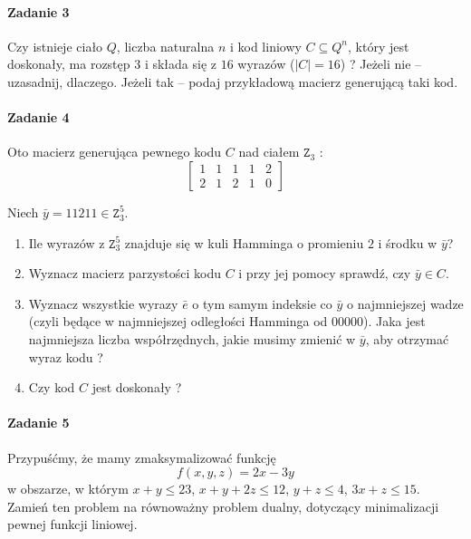 \paragraph{Zadanie 3} Czy istnieje ciało $Q$, liczba naturalna $n$ i kod liniowy $C \subseteq Q^n$, który jest doskonały, ma rozstęp $3$ i składa się z $16$ wyrazów ($|C| = 16$) ? Jeżeli nie – uzasadnij, dlaczego. Jeżeli tak – podaj przykładową macierz generującą taki kod.

\paragraph{Zadanie 4} Oto macierz generująca pewnego kodu $C$ nad ciałem $\mathtt{Z}_3$ :
$$\begin{bmatrix}
1& 1& 1& 1& 2\\
2& 1& 2& 1& 0
\end{bmatrix}$$

Niech $\bar{y} = 11211 \in \mathtt{Z}^5_3$.
\begin{enumerate}[label=\alph*)]
\item Ile wyrazów z $\mathtt{Z}^5_3$
znajduje się w kuli Hamminga o promieniu $2$ i środku w $\bar{y}$?
\item Wyznacz macierz parzystości kodu $C$ i przy jej pomocy sprawdź, czy $\bar{y} \in C$.
\item Wyznacz wszystkie wyrazy $\bar{e}$ o tym samym indeksie co $\bar{y}$ o najmniejszej wadze (czyli będące w najmniejszej odległości Hamminga od $00000$). Jaka jest najmniejsza liczba współrzędnych, jakie musimy zmienić w $\bar{y}$, aby otrzymać wyraz kodu ?
\item Czy kod $C$ jest doskonały ?
\end{enumerate}

\paragraph{Zadanie 5} Przypuśćmy, że mamy zmaksymalizować funkcję $$f(x, y, z) = 2x - 3y$$ w obszarze, w którym $x + y \leq 23$, $x + y + 2z \leq 12$, $y + z \leq 4$, $3x + z \leq 15$. Zamień ten problem na równoważny problem dualny, dotyczący minimalizacji pewnej funkcji liniowej.

